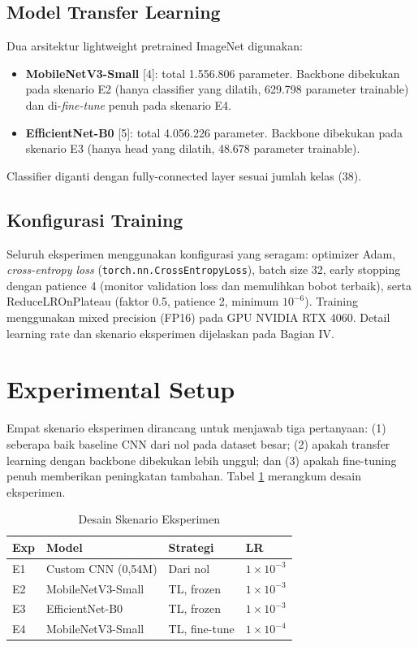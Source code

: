 \documentclass[conference,a4paper]{IEEEtran}
\begin{document}
\subsection{Model Transfer Learning}
Dua arsitektur lightweight pretrained ImageNet digunakan:
\begin{itemize}
\item \textbf{MobileNetV3-Small} [4]: total 1.556.806 parameter. Backbone dibekukan pada skenario E2 (hanya classifier yang dilatih, 629.798 parameter trainable) dan di-\emph{fine-tune} penuh pada skenario E4.
\item \textbf{EfficientNet-B0} [5]: total 4.056.226 parameter. Backbone dibekukan pada skenario E3 (hanya head yang dilatih, 48.678 parameter trainable).
\end{itemize}
Classifier diganti dengan fully-connected layer sesuai jumlah kelas (38).

\subsection{Konfigurasi Training}
Seluruh eksperimen menggunakan konfigurasi yang seragam: optimizer Adam, \emph{cross-entropy loss} (\texttt{torch.nn.CrossEntropyLoss}), batch size 32, early stopping dengan patience 4 (monitor validation loss dan memulihkan bobot terbaik), serta ReduceLROnPlateau (faktor 0.5, patience 2, minimum $10^{-6}$). Training menggunakan mixed precision (FP16) pada GPU NVIDIA RTX 4060. Detail learning rate dan skenario eksperimen dijelaskan pada Bagian IV.

\section{Experimental Setup}

Empat skenario eksperimen dirancang untuk menjawab tiga pertanyaan: (1) seberapa baik baseline CNN dari nol pada dataset besar; (2) apakah transfer learning dengan backbone dibekukan lebih unggul; dan (3) apakah fine-tuning penuh memberikan peningkatan tambahan. Tabel \ref{tab:exp} merangkum desain eksperimen.

\begin{table}[htbp]
\caption{Desain Skenario Eksperimen}
\label{tab:exp}
\begin{center}
\begin{tabular}{@{}llll@{}}
\toprule
\textbf{Exp} & \textbf{Model} & \textbf{Strategi} & \textbf{LR} \\
\midrule
E1 & Custom CNN (0,54M) & Dari nol & $1\times10^{-3}$ \\
E2 & MobileNetV3-Small & TL, frozen & $1\times10^{-3}$ \\
E3 & EfficientNet-B0 & TL, frozen & $1\times10^{-3}$ \\
E4 & MobileNetV3-Small & TL, fine-tune & $1\times10^{-4}$ \\
\bottomrule
\end{tabular}
\end{center}
\end{table}
\end{document}
